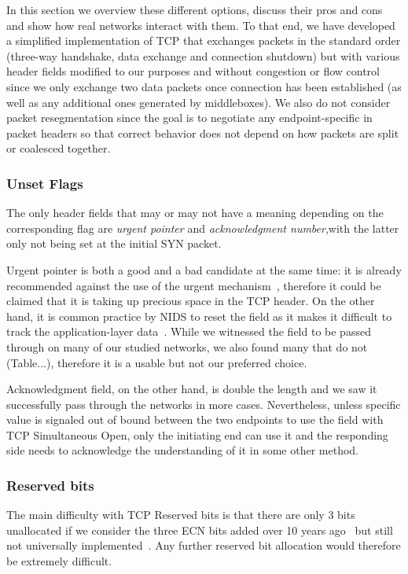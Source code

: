 \documentclass{sig-alternate-10pt}
\begin{document}
In this section we overview these different options, discuss their pros and cons and show how real networks interact with them. To that end, we have developed a simplified implementation of TCP that exchanges packets in the standard order (three-way handshake, data exchange and connection shutdown) but with various header fields modified to our purposes and without congestion or flow control since we only exchange two data packets once connection has been established (as well as any additional ones generated by middleboxes). We also do not consider packet resegmentation since the goal is to negotiate any endpoint-specific in packet headers so that correct behavior does not depend on how packets are split or coalesced together.

\subsubsection*{Unset Flags}

The only header fields that may or may not have a meaning depending on the corresponding flag are \emph{urgent pointer} and \emph{acknowledgment number},with the latter only not being set at the initial SYN packet.

Urgent pointer is both a good and a bad candidate at the same time: it is already recommended against the use of the urgent mechanism~\cite{Gont:2011vi}, therefore it could be claimed that it is taking up precious space in the TCP header. On the other hand, it is common practice by NIDS to reset the field as it makes it difficult to track the application-layer data~\cite{seolma}. While we witnessed the field to be passed through on many of our studied networks, we also found many that do not (Table...), therefore it is a usable but not our preferred choice.

Acknowledgment field, on the other hand, is double the length and we saw it successfully pass through the networks in more cases. Nevertheless, unless specific value is signaled out of bound between the two endpoints to use the field with TCP Simultaneous Open, only the initiating end can use it and the responding side needs to acknowledge the understanding of it in some other method. 

\subsubsection*{Reserved bits}

The main difficulty with TCP Reserved bits is that there are only 3 bits unallocated if we consider the three ECN bits added over 10 years ago~\cite{Floyd:up,Ely:uc} but still not universally implemented~\cite{}. Any further reserved bit allocation would therefore be extremely difficult.
\end{document}
